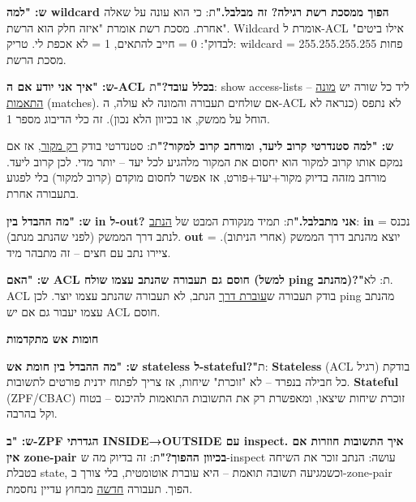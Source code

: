 \documentclass[11pt]{article}
\newcommand{\enLR}[1]{\textenglish{#1}}
\newcommand{\code}[1]{\textenglish{\codefont #1}}
\newcommand{\subheading}[1]{\vskip6pt{\bfseries\color{h3}#1\par}\vskip2pt}
\begin{document}
\textbf{ש: "למה \enLR{wildcard} הפוך ממסכת רשת רגילה? זה מבלבל."}\newline ת: כי הוא עונה על שאלה אחרת. מסכת רשת אומרת "איזה חלק הוא הרשת". \enLR{Wildcard} אומרת ל-\enLR{ACL "}אילו ביטים לבדוק": \enLR{0} = חייב להתאים, \enLR{1} = לא אכפת לי. טריק: \enLR{wildcard = 255.255.255.255} פחות מסכת הרשת.\par

\textbf{ש: "איך אני יודע אם ה-\enLR{ACL} בכלל עובד?"}\newline ת: \code{show access-lists} – ליד כל שורה יש \underline{מונה התאמות} \enLR{(matches).} אם שולחים תעבורה והמונה לא עולה, ה-\enLR{ACL} לא נתפס (כנראה לא הוחל על ממשק, או בכיוון הלא נכון). זה כלי הדיבוג מספר \enLR{1.}\par

\textbf{ש: "למה סטנדרטי קרוב ליעד, ומורחב קרוב למקור?"}\newline ת: סטנדרטי בודק \underline{רק מקור}, אז אם נמקם אותו קרוב למקור הוא יחסום את המקור מלהגיע לכל יעד – יותר מדי. לכן קרוב ליעד. מורחב מזהה בדיוק מקור+יעד+פורט, אז אפשר לחסום מוקדם (קרוב למקור) בלי לפגוע בתעבורה אחרת.\par

\textbf{ש: "מה ההבדל בין \enLR{in} ל-\enLR{out}? אני מתבלבל."}\newline ת: תמיד מנקודת המבט של \underline{הנתב}: \textbf{\enLR{in}} = נכנס לנתב דרך הממשק (לפני שהנתב מנתב). \textbf{\enLR{out}} = יוצא מהנתב דרך הממשק (אחרי הניתוב). ציירו נתב עם חצים – זה מתבהר מיד.\par

\textbf{ש: "האם \enLR{ACL} חוסם גם תעבורה שהנתב עצמו שולח (למשל \enLR{ping} מהנתב)?"}\newline ת: לא. \enLR{ACL} בודק תעבורה ש\underline{עוברת דרך} הנתב, לא תעבורה שהנתב עצמו יוצר. לכן \enLR{ping} מהנתב עצמו יעבור גם אם יש \enLR{ACL} חוסם.\par

\subheading{חומות אש מתקדמות}

\textbf{ש: "מה ההבדל בין חומת אש \enLR{stateless} ל-\enLR{stateful}?"}\newline ת: \textbf{\enLR{Stateless}} \enLR{(ACL} רגיל) בודקת כל חבילה בנפרד – לא "זוכרת" שיחות, אז צריך לפתוח ידנית פורטים לתשובות. \textbf{\enLR{Stateful}} \enLR{(ZPF/CBAC)} זוכרת שיחות שיצאו, ומאפשרת רק את התשובות התואמות להיכנס – בטוח וקל בהרבה.\par

\textbf{ש: "ב-\enLR{ZPF} הגדרתי \enLR{INSIDE}→\enLR{OUTSIDE} עם \enLR{inspect.} איך התשובות חוזרות אם אין \enLR{zone-pair} בכיוון ההפוך?"}\newline ת: זה בדיוק מה ש-\code{inspect} עושה: הנתב זוכר את השיחה בטבלת \enLR{state}, וכשמגיעה תשובה תואמת – היא עוברת אוטומטית, בלי צורך ב-\enLR{zone-pair} הפוך. תעבורה \underline{חדשה} מבחוץ עדיין נחסמת.\par
\end{document}
